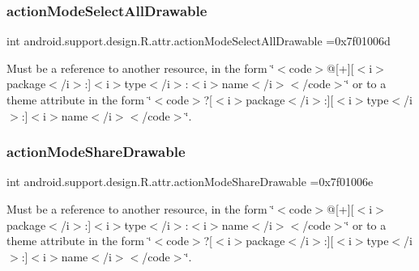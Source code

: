 \subsubsection{\texorpdfstring{action\+Mode\+Select\+All\+Drawable}{actionModeSelectAllDrawable}}
{\footnotesize\ttfamily int android.\+support.\+design.\+R.\+attr.\+action\+Mode\+Select\+All\+Drawable =0x7f01006d\hspace{0.3cm}{\ttfamily [static]}}

Must be a reference to another resource, in the form \char`\"{}$<$code$>$@\mbox{[}+\mbox{]}\mbox{[}$<$i$>$package$<$/i$>$\+:\mbox{]}$<$i$>$type$<$/i$>$\+:$<$i$>$name$<$/i$>$$<$/code$>$\char`\"{} or to a theme attribute in the form \char`\"{}$<$code$>$?\mbox{[}$<$i$>$package$<$/i$>$\+:\mbox{]}\mbox{[}$<$i$>$type$<$/i$>$\+:\mbox{]}$<$i$>$name$<$/i$>$$<$/code$>$\char`\"{}. \mbox{\label{classandroid_1_1support_1_1design_1_1R_1_1attr_ad6838a7f1f0cfe43673bb4251abc61c6}} 
\subsubsection{\texorpdfstring{action\+Mode\+Share\+Drawable}{actionModeShareDrawable}}
{\footnotesize\ttfamily int android.\+support.\+design.\+R.\+attr.\+action\+Mode\+Share\+Drawable =0x7f01006e\hspace{0.3cm}{\ttfamily [static]}}

Must be a reference to another resource, in the form \char`\"{}$<$code$>$@\mbox{[}+\mbox{]}\mbox{[}$<$i$>$package$<$/i$>$\+:\mbox{]}$<$i$>$type$<$/i$>$\+:$<$i$>$name$<$/i$>$$<$/code$>$\char`\"{} or to a theme attribute in the form \char`\"{}$<$code$>$?\mbox{[}$<$i$>$package$<$/i$>$\+:\mbox{]}\mbox{[}$<$i$>$type$<$/i$>$\+:\mbox{]}$<$i$>$name$<$/i$>$$<$/code$>$\char`\"{}. \mbox{\label{classandroid_1_1support_1_1design_1_1R_1_1attr_a23e600a698dd003c399ac9144d43cc86}} 
